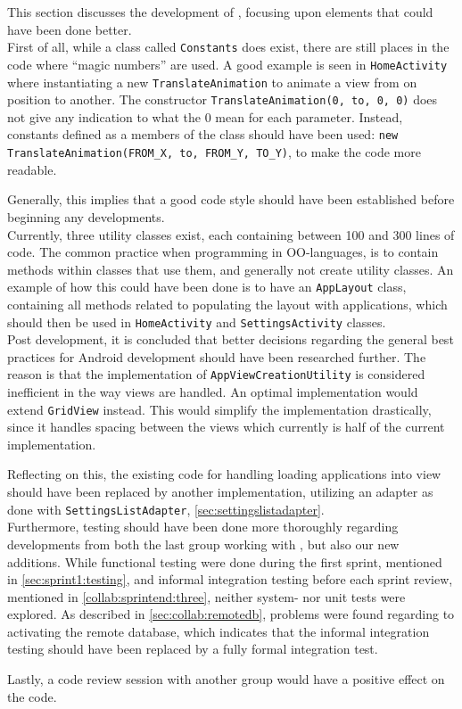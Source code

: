 This section discusses the development of \launcher, focusing upon elements that could have been done better.\\

First of all, while a class called \lstinline|Constants| does exist, there are still places in the code where ``magic numbers'' are used.
A good example is seen in \lstinline|HomeActivity| where instantiating a new \lstinline|TranslateAnimation| to animate a view from on position to another.
The constructor \lstinline|TranslateAnimation(0, to, 0, 0)| does not give any indication to what the 0 mean for each parameter.
Instead, constants defined as a members of the class should have been used: \lstinline|new TranslateAnimation(FROM_X, to, FROM_Y, TO_Y)|, to make the code more readable.

Generally, this implies that a good code style should have been established before beginning any developments.
\\

Currently, three utility classes exist, each containing between 100 and 300 lines of code.
The common practice when programming in OO-languages, is to contain methods within classes that use them, and generally not create utility classes.
An example of how this could have been done is to have an \lstinline|AppLayout| class, containing all methods related to populating the layout with applications, which should then be used in \lstinline|HomeActivity| and \lstinline|SettingsActivity| classes.\\


Post development, it is concluded that better decisions regarding the general best practices for Android development should have been researched further.
The reason is that the implementation of \lstinline|AppViewCreationUtility| is considered inefficient in the way views are handled.
An optimal implementation would extend \lstinline|GridView| instead.
This would simplify the implementation drastically, since it handles spacing between the views which currently is half of the current implementation.

Reflecting on this, the existing code for handling loading applications into view should have been replaced by another implementation, utilizing an adapter as done with \lstinline|SettingsListAdapter|, \cref{sec:settingslistadapter}.\\

Furthermore, testing should have been done more thoroughly regarding developments from both the last group working with \launcher, but also our new additions.
While functional testing were done during the first sprint, mentioned in \cref{sec:sprint1:testing}, and informal integration testing before each sprint review, mentioned in \cref{collab:sprintend:three}, neither system- nor unit tests were explored.
As described in \cref{sec:collab:remotedb}, problems were found regarding to activating the remote database, which indicates that the informal integration testing should have been replaced by a fully formal integration test.

Lastly, a code review session with another group would have a positive effect on the code.